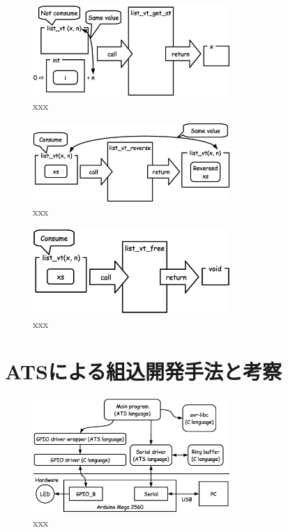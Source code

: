 \documentclass{ipsjprosym}
\begin{document}
\begin{figure}[h]
\centering
\includegraphics[width=75mm]{draw/list_vt_get_at.eps}
\caption{xxx}
\label{fig:xxx}
\end{figure}

\begin{figure}[h]
\centering
\includegraphics[width=75mm]{draw/list_vt_reverse.eps}
\caption{xxx}
\label{fig:xxx}
\end{figure}

\begin{figure}[h]
\centering
\includegraphics[width=75mm]{draw/list_vt_free.eps}
\caption{xxx}
\label{fig:xxx}
\end{figure}

\section{ATSによる組込開発手法と考察}

\begin{figure}[h]
\centering
\includegraphics[width=75mm]{draw/demo_ats_arduino.eps}
\caption{xxx}
\label{fig:demo_ats_arduino}
\end{figure}
\end{document}
